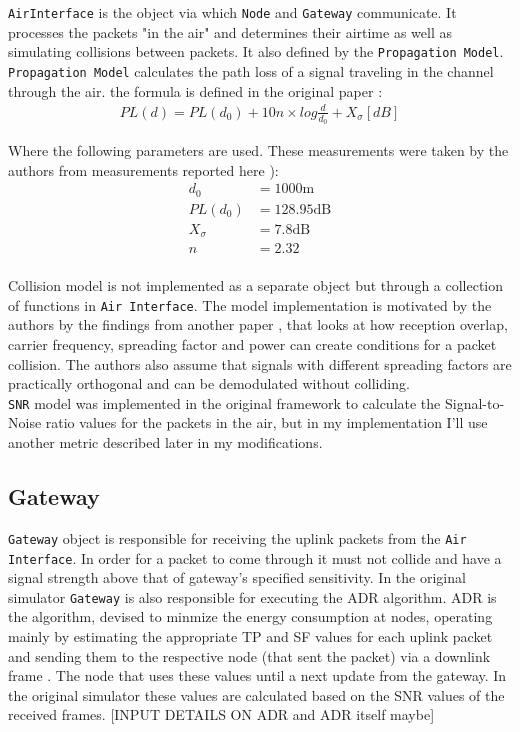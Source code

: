\texttt{AirInterface} is the object via which \texttt{Node} and \texttt{Gateway} communicate. It processes the packets "in the air" and determines their airtime as well as simulating collisions between packets. It also defined by the \texttt{Propagation Model}.\\

\texttt{Propagation Model} calculates the path loss 
of a signal traveling in the channel through the air.
the formula is defined in the original paper \cite{simulator} :
\begin{align}
    PL(d) = PL(d_0) + 10n\times log\frac{d}{d_0} + X_{\sigma} [dB] \label{eq:propagation_model}
\end{align}

Where the following parameters are used. These measurements were taken by the authors \cite{simulator} from measurements reported here \cite{propagation_model_parameters}):
\begin{align*}
     d_0 & = 1000 \text{m}\\
     PL(d_0) & = 128.95 \text{dB}\\
     X_{\sigma} & = 7.8 \text{dB}\\
     n & = 2.32\\
\end{align*}

Collision model is not implemented as a separate object but through a collection of functions in \texttt{Air Interface}. The model implementation is motivated by the authors \cite{simulator} by the findings from another paper \cite{collision_conditions}, that looks at how reception overlap, carrier frequency, spreading factor and power can create conditions for a packet collision. The authors \cite{simulator} also assume that signals with different spreading factors are practically orthogonal and can be demodulated without colliding.\\

\texttt{SNR} model was implemented in the original framework to
calculate the Signal-to-Noise ratio values for the packets in the air, but in my implementation I'll use another metric 
described later in my modifications.

\subsection{Gateway}

\texttt{Gateway} object is responsible for receiving 
the uplink packets from the \texttt{Air Interface}. In order for a packet to come through it must not collide and have  a signal strength above that of gateway's specified sensitivity. In the original simulator \cite{simulator} \texttt{Gateway} is also responsible for executing the ADR algorithm. ADR is the algorithm, devised to minmize the energy consumption at nodes, operating mainly by estimating the appropriate TP and SF values for each uplink packet and sending them to the respective node (that sent the packet) via a downlink frame \cite{simulator}. The node that uses these values until a next update from the gateway. In the original simulator these values are calculated based on the SNR values of the received frames. 
[INPUT DETAILS ON ADR and ADR itself maybe] \\

